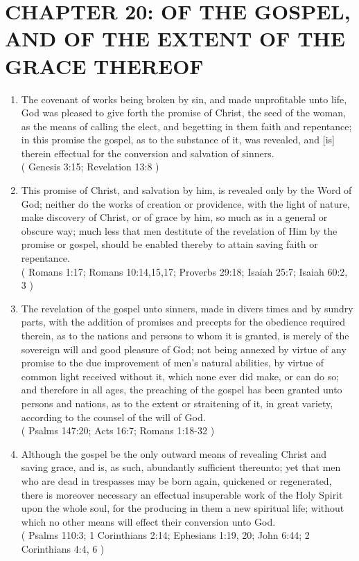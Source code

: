 \documentclass[12pt,a4paper]{book}
\begin{document}
\chapter{CHAPTER 20: OF THE GOSPEL, AND OF THE EXTENT OF THE GRACE THEREOF}
\label{ch-gos-ext}
\begin{enumerate}
\item The covenant of works being broken by sin, and made unprofitable unto life, God was pleased to give forth the promise of Christ, the seed of the woman, as the means of calling the elect, and begetting in them faith and repentance; in this promise the gospel, as to the substance of it, was revealed, and [is] therein effectual for the conversion and salvation of sinners.\\
( Genesis 3:15; Revelation 13:8 )
\item This promise of Christ, and salvation by him, is revealed only by the Word of God; neither do the works of creation or providence, with the light of nature, make discovery of Christ, or of grace by him, so much as in a general or obscure way; much less that men destitute of the revelation of Him by the promise or gospel, should be enabled thereby to attain saving faith or repentance.\\
( Romans 1:17; Romans 10:14,15,17; Proverbs 29:18; Isaiah 25:7; Isaiah 60:2, 3 )
\item The revelation of the gospel unto sinners, made in divers times and by sundry parts, with the addition of promises and precepts for the obedience required therein, as to the nations and persons to whom it is granted, is merely of the sovereign will and good pleasure of God; not being annexed by virtue of any promise to the due improvement of men's natural abilities, by virtue of common light received without it, which none ever did make, or can do so; and therefore in all ages, the preaching of the gospel has been granted unto persons and nations, as to the extent or straitening of it, in great variety, according to the counsel of the will of God.\\
( Psalms 147:20; Acts 16:7; Romans 1:18-32 )
\item Although the gospel be the only outward means of revealing Christ and saving grace, and is, as such, abundantly sufficient thereunto; yet that men who are dead in trespasses may be born again, quickened or regenerated, there is moreover necessary an effectual insuperable work of the Holy Spirit upon the whole soul, for the producing in them a new spiritual life; without which no other means will effect their conversion unto God.\\
( Psalms 110:3; 1 Corinthians 2:14; Ephesians 1:19, 20; John 6:44; 2 Corinthians 4:4, 6 )
\end{enumerate}
\end{document}
